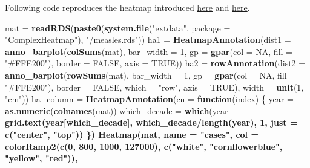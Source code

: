 \documentclass[]{book}
\newenvironment{Shaded}{\begin{snugshade}}{\end{snugshade}}
\newcommand{\KeywordTok}[1]{\textcolor[rgb]{0.13,0.29,0.53}{\textbf{#1}}}
\newcommand{\DataTypeTok}[1]{\textcolor[rgb]{0.13,0.29,0.53}{#1}}
\newcommand{\DecValTok}[1]{\textcolor[rgb]{0.00,0.00,0.81}{#1}}
\newcommand{\StringTok}[1]{\textcolor[rgb]{0.31,0.60,0.02}{#1}}
\newcommand{\OtherTok}[1]{\textcolor[rgb]{0.56,0.35,0.01}{#1}}
\newcommand{\ControlFlowTok}[1]{\textcolor[rgb]{0.13,0.29,0.53}{\textbf{#1}}}
\newcommand{\OperatorTok}[1]{\textcolor[rgb]{0.81,0.36,0.00}{\textbf{#1}}}
\newcommand{\NormalTok}[1]{#1}
\theoremstyle{definition}
\theoremstyle{definition}
\theoremstyle{definition}
\theoremstyle{remark}
\begin{document}
Following code reproduces the heatmap introduced
\href{https://biomickwatson.wordpress.com/2015/04/09/recreating-a-famous-visualisation/}{here}
and
\href{https://benjaminlmoore.wordpress.com/2015/04/09/recreating-the-vaccination-heatmaps-in-r/}{here}.

\begin{Shaded}
\begin{Highlighting}[]
\NormalTok{mat =}\StringTok{ }\KeywordTok{readRDS}\NormalTok{(}\KeywordTok{paste0}\NormalTok{(}\KeywordTok{system.file}\NormalTok{(}\StringTok{"extdata"}\NormalTok{, }\DataTypeTok{package =} \StringTok{"ComplexHeatmap"}\NormalTok{), }\StringTok{"/measles.rds"}\NormalTok{))}
\NormalTok{ha1 =}\StringTok{ }\KeywordTok{HeatmapAnnotation}\NormalTok{(}\DataTypeTok{dist1 =} \KeywordTok{anno_barplot}\NormalTok{(}\KeywordTok{colSums}\NormalTok{(mat), }\DataTypeTok{bar_width =} \DecValTok{1}\NormalTok{, }\DataTypeTok{gp =} \KeywordTok{gpar}\NormalTok{(}\DataTypeTok{col =} \OtherTok{NA}\NormalTok{, }\DataTypeTok{fill =} \StringTok{"#FFE200"}\NormalTok{), }
    \DataTypeTok{border =} \OtherTok{FALSE}\NormalTok{, }\DataTypeTok{axis =} \OtherTok{TRUE}\NormalTok{))}
\NormalTok{ha2 =}\StringTok{ }\KeywordTok{rowAnnotation}\NormalTok{(}\DataTypeTok{dist2 =} \KeywordTok{anno_barplot}\NormalTok{(}\KeywordTok{rowSums}\NormalTok{(mat), }\DataTypeTok{bar_width =} \DecValTok{1}\NormalTok{, }\DataTypeTok{gp =} \KeywordTok{gpar}\NormalTok{(}\DataTypeTok{col =} \OtherTok{NA}\NormalTok{, }\DataTypeTok{fill =} \StringTok{"#FFE200"}\NormalTok{), }
    \DataTypeTok{border =} \OtherTok{FALSE}\NormalTok{, }\DataTypeTok{which =} \StringTok{"row"}\NormalTok{, }\DataTypeTok{axis =} \OtherTok{TRUE}\NormalTok{), }\DataTypeTok{width =} \KeywordTok{unit}\NormalTok{(}\DecValTok{1}\NormalTok{, }\StringTok{"cm"}\NormalTok{))}
\NormalTok{ha_column =}\StringTok{ }\KeywordTok{HeatmapAnnotation}\NormalTok{(}\DataTypeTok{cn =} \ControlFlowTok{function}\NormalTok{(index) \{}
\NormalTok{    year =}\StringTok{ }\KeywordTok{as.numeric}\NormalTok{(}\KeywordTok{colnames}\NormalTok{(mat))}
\NormalTok{    which_decade =}\StringTok{ }\KeywordTok{which}\NormalTok{(year }\OperatorTok{%
    \KeywordTok{grid.text}\NormalTok{(year[which_decade], which_decade}\OperatorTok{/}\KeywordTok{length}\NormalTok{(year), }\DecValTok{1}\NormalTok{, }\DataTypeTok{just =} \KeywordTok{c}\NormalTok{(}\StringTok{"center"}\NormalTok{, }\StringTok{"top"}\NormalTok{))}
\NormalTok{\})}
\KeywordTok{Heatmap}\NormalTok{(mat, }\DataTypeTok{name =} \StringTok{"cases"}\NormalTok{, }\DataTypeTok{col =} \KeywordTok{colorRamp2}\NormalTok{(}\KeywordTok{c}\NormalTok{(}\DecValTok{0}\NormalTok{, }\DecValTok{800}\NormalTok{, }\DecValTok{1000}\NormalTok{, }\DecValTok{127000}\NormalTok{), }\KeywordTok{c}\NormalTok{(}\StringTok{"white"}\NormalTok{, }\StringTok{"cornflowerblue"}\NormalTok{, }\StringTok{"yellow"}\NormalTok{, }\StringTok{"red"}\NormalTok{)),}
}
\end{Highlighting}
\end{Shaded}
\end{document}
